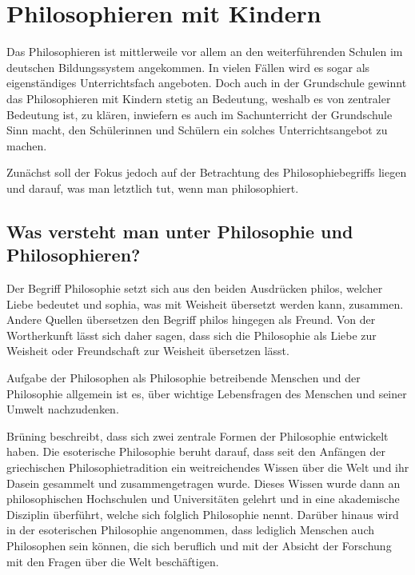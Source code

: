 \section{Philosophieren mit Kindern}

Das Philosophieren ist mittlerweile vor allem an den weiterführenden Schulen im deutschen Bildungssystem angekommen.
 In vielen Fällen wird es sogar als eigenständiges Unterrichtsfach angeboten. 
 Doch auch in der Grundschule gewinnt das Philosophieren mit Kindern stetig an Bedeutung, weshalb es von zentraler Bedeutung ist, zu klären, inwiefern es auch im Sachunterricht der 
 Grundschule Sinn macht, den Schülerinnen und Schülern ein solches Unterrichtsangebot zu machen. 
 
Zunächst soll der Fokus jedoch auf der Betrachtung des Philosophiebegriffs liegen und darauf, was man letztlich tut, wenn man philosophiert.



\subsection{Was versteht man unter Philosophie und Philosophieren?}

Der Begriff \glqq Philosophie\grqq{} setzt sich aus den beiden Ausdrücken \glqq philos\grqq{}, welcher Liebe bedeutet und \glqq sophia\grqq{}, was mit Weisheit übersetzt werden kann, zusammen\cite{BB10, S.8}. 
Andere Quellen übersetzen den Begriff \glqq philos\grqq{} hingegen als Freund\cite{GT16}. 
Von der Wortherkunft lässt sich daher sagen, dass sich die Philosophie als \glqq Liebe zur Weisheit\grqq{} oder \glqq Freundschaft zur Weisheit\grqq{} übersetzen lässt. 

Aufgabe der Philosophen als Philosophie betreibende Menschen und der Philosophie allgemein ist es, \glqq über wichtige Lebensfragen\grqq{} des Menschen und seiner Umwelt nachzudenken\cite{BB10, S.8}. 

Brüning beschreibt, dass sich zwei zentrale Formen der Philosophie entwickelt haben. 
Die esoterische Philosophie beruht darauf, dass seit den Anfängen der griechischen Philosophietradition ein weitreichendes Wissen über die Welt und ihr Dasein gesammelt und zusammengetragen wurde. 
Dieses Wissen wurde dann an philosophischen Hochschulen und Universitäten gelehrt und in eine akademische Disziplin überführt, welche sich folglich Philosophie nennt. 
Darüber hinaus wird in der esoterischen Philosophie angenommen, dass lediglich Menschen auch Philosophen sein können, die sich beruflich und mit der Absicht der Forschung mit den Fragen über die Welt beschäftigen.

